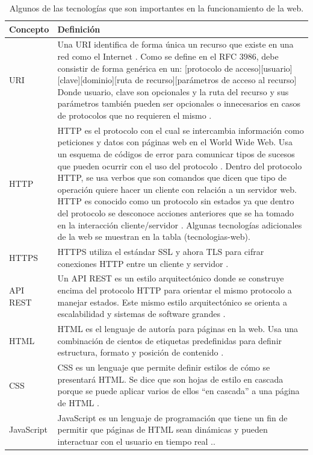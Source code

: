 \begin{table}[h!]
    \begin{tabular}{|p{}|p{}|}
    	\hline
        Concepto & Definición \\
    	\hline
        URI & Una URI identifica de forma única un recurso que existe en una red como el Internet \citep{Webopedia-URI}. Como se define en el RFC 3986, debe consistir de forma genérica en un:
[protocolo de acceso][usuario][clave][dominio][ruta de recurso][parámetros de acceso al recurso]
Donde usuario, clave son opcionales y la ruta del recurso y sus parámetros también pueden ser opcionales o innecesarios en casos de protocolos que no requieren el mismo \citep{RFC3986}. \\
        \hline
    	HTTP & HTTP es el protocolo con el cual se intercambia información como peticiones y datos con páginas web en el World Wide Web. Usa un esquema de códigos de error para comunicar tipos de sucesos que pueden ocurrir con el uso del protocolo \citep{ComputerHope-HTTP}. Dentro del protocolo HTTP, se usa verbos que son comandos que dicen que tipo de operación quiere hacer un cliente con relación a un servidor web. HTTP es conocido como un protocolo sin estados ya que dentro del protocolo se desconoce acciones anteriores que se ha tomado en la interacción cliente/servidor \citep{Webopedia-HTTP}. Algunas tecnologías adicionales de la web se muestran en la tabla (tecnologias-web). \\
        \hline
        HTTPS & HTTPS utiliza el estándar SSL y ahora TLS para cifrar conexiones HTTP entre un cliente y servidor \citep{ComputerHope-HTTP}. \\
        \hline
        API REST & Un API REST es un estilo arquitectónico donde se construye encima del protocolo HTTP para orientar el mismo protocolo a manejar estados. Este mismo estilo arquitectónico se orienta a escalabilidad y sistemas de software grandes \citep{Webopedia-REST}. \\
        \hline
        HTML & HTML es el lenguaje de autoría para páginas en la web. Usa una combinación de cientos de etiquetas predefinidas para definir estructura, formato y posición de contenido \citep{Webopedia-HTML}. \\
        \hline
        CSS & CSS es un lenguaje que permite definir estilos de cómo se presentará HTML. Se dice que son hojas de estilo en cascada porque se puede aplicar varios de ellos “en cascada” a una página de HTML \citep{Webopedia-CSS}. \\
        \hline
        JavaScript & JavaScript es un lenguaje de programación que tiene un fin de permitir que páginas de HTML sean dinámicas y pueden interactuar con el usuario en tiempo real \citep{Webopedia-JavaScript}.. \\
        \hline
    \end{tabular}
	\caption{Algunos de las tecnologías que son importantes en la funcionamiento de la web.}
    \label{tecnologias-web}
\end{table}

